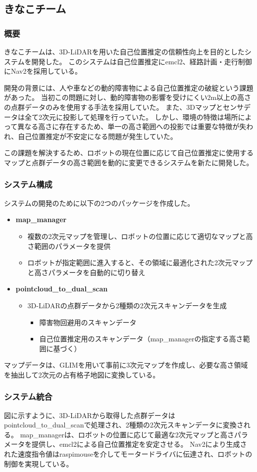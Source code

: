 \subsection{きなこチーム}

\subsubsection{概要}
きなこチームは、3D-LiDARを用いた自己位置推定の信頼性向上を目的としたシステムを開発した。
このシステムは自己位置推定にemcl2、経路計画・走行制御にNav2を採用している。

開発の背景には、人や車などの動的障害物による自己位置推定の破綻という課題があった。
当初この問題に対し、動的障害物の影響を受けにくい2m以上の高さの点群データのみを使用する手法を採用していた。
また、3Dマップとセンサデータは全て2次元に投影して処理を行っていた。
しかし、環境の特徴は場所によって異なる高さに存在するため、単一の高さ範囲への投影では重要な特徴が失われ、自己位置推定が不安定になる問題が発生していた。

この課題を解決するため、ロボットの現在位置に応じて自己位置推定に使用するマップと点群データの高さ範囲を動的に変更できるシステムを新たに開発した。

\subsubsection{システム構成}
システムの開発のために以下の2つのパッケージを作成した。

\begin{itemize}
  \item \textbf{map\_manager}
    \begin{itemize}
      \item 複数の2次元マップを管理し、ロボットの位置に応じて適切なマップと高さ範囲のパラメータを提供
      \item ロボットが指定範囲に進入すると、その領域に最適化された2次元マップと高さパラメータを自動的に切り替え
    \end{itemize}
  \item \textbf{pointcloud\_to\_dual\_scan}
    \begin{itemize}
      \item 3D-LiDARの点群データから2種類の2次元スキャンデータを生成
        \begin{itemize}
          \item 障害物回避用のスキャンデータ
          \item 自己位置推定用のスキャンデータ（map\_managerの指定する高さ範囲に基づく）
        \end{itemize}
    \end{itemize}
\end{itemize}

マップデータは、GLIMを用いて事前に3次元マップを作成し、必要な高さ領域を抽出して2次元の占有格子地図に変換している。


\subsubsection{システム統合}
図に示すように、3D-LiDARから取得した点群データはpointcloud\_to\_dual\_scanで処理され、2種類の2次元スキャンデータに変換される。
map\_managerは、ロボットの位置に応じて最適な2次元マップと高さパラメータを提供し、emcl2による自己位置推定を安定させる。
Nav2により生成された速度指令値はraspimouseを介してモータードライバに伝達され、ロボットの制御を実現している。